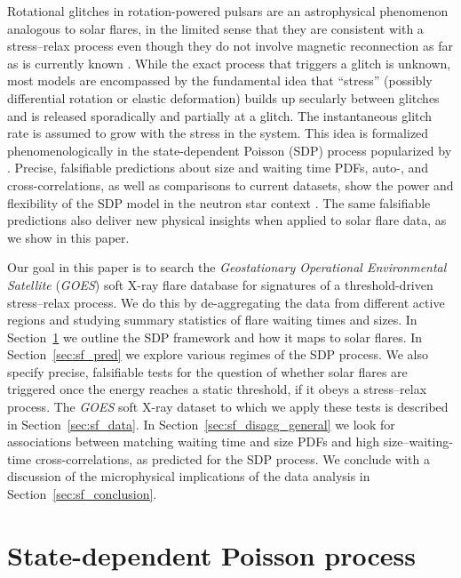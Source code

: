 Rotational glitches in rotation-powered pulsars \citep{Lyne2012, Haskell2015} are an astrophysical phenomenon analogous to solar flares, in the limited sense that they are consistent with a stress--relax process even though they do not involve magnetic reconnection as far as is currently known \citep{Aschwanden2018}. While the exact process that triggers a glitch is unknown, most models are encompassed by the fundamental idea that ``stress'' (possibly differential rotation or elastic deformation) builds up secularly between glitches and is released sporadically and partially at a glitch. The instantaneous glitch rate is assumed to grow with the stress in the system. This idea is formalized phenomenologically in the state-dependent Poisson (SDP) process popularized by \citet{Fulgenzi2017}. Precise, falsifiable predictions about size and waiting time PDFs, auto-, and cross-correlations, as well as comparisons to current datasets, show the power and flexibility of the SDP model in the neutron star context \citep{Melatos2018, Carlin2019quasi, Carlin2019ac, Melatos2019}. The same falsifiable predictions also deliver new physical insights when applied to solar flare data, as we show in this paper. 

Our goal in this paper is to search the \emph{Geostationary Operational Environmental Satellite} (\emph{GOES}) soft X-ray flare database for signatures of a threshold-driven stress--relax process. We do this by de-aggregating the data from different active regions and studying summary statistics of flare waiting times and sizes. In Section~\ref{sec:sf_sdp} we outline the SDP framework and how it maps to solar flares. In Section~\ref{sec:sf_pred} we explore various regimes of the SDP process. We also specify precise, falsifiable tests for the question of whether solar flares are triggered once the energy reaches a static threshold, if it obeys a stress--relax process. The \emph{GOES} soft X-ray dataset to which we apply these tests is described in Section~\ref{sec:sf_data}. In Section~\ref{sec:sf_disagg_general} we look for associations between matching waiting time and size PDFs and high size--waiting-time cross-correlations, as predicted for the SDP process. We conclude with a discussion of the microphysical implications of the data analysis in Section~\ref{sec:sf_conclusion}.

\section{State-dependent Poisson process} \label{sec:sf_sdp}
